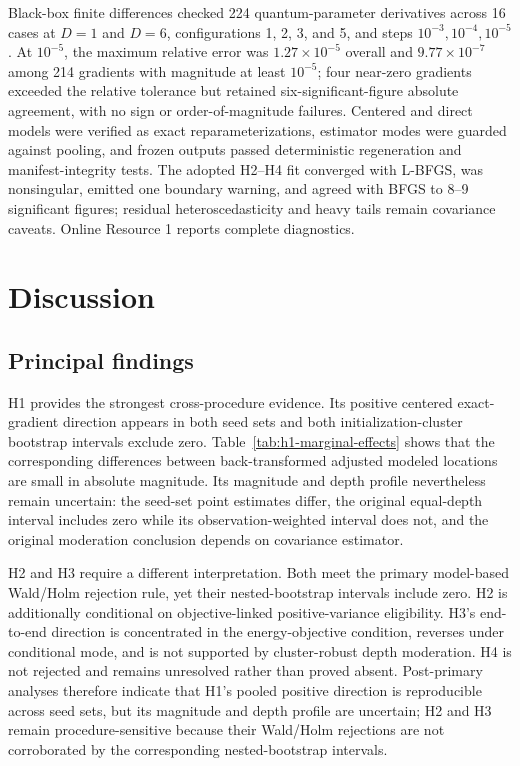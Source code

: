 \documentclass[pdflatex,sn-basic,Numbered]{sn-jnl}
\begin{document}
Black-box finite differences checked 224 quantum-parameter derivatives across 16 cases at $D=1$ and $D=6$, configurations 1, 2, 3, and 5, and steps $10^{-3},10^{-4},10^{-5}$. At $10^{-5}$, the maximum relative error was $1.27\times10^{-5}$ overall and $9.77\times10^{-7}$ among 214 gradients with magnitude at least $10^{-5}$; four near-zero gradients exceeded the relative tolerance but retained six-significant-figure absolute agreement, with no sign or order-of-magnitude failures. Centered and direct models were verified as exact reparameterizations, estimator modes were guarded against pooling, and frozen outputs passed deterministic regeneration and manifest-integrity tests. The adopted H2--H4 fit converged with L-BFGS, was nonsingular, emitted one boundary warning, and agreed with BFGS to 8--9 significant figures; residual heteroscedasticity and heavy tails remain covariance caveats. Online Resource 1 reports complete diagnostics.

\section{Discussion}

\subsection{Principal findings}

H1 provides the strongest cross-procedure evidence. Its positive centered exact-gradient direction appears in both seed sets and both initialization-cluster bootstrap intervals exclude zero. Table~\ref{tab:h1-marginal-effects} shows that the corresponding differences between back-transformed adjusted modeled locations are small in absolute magnitude. Its magnitude and depth profile nevertheless remain uncertain: the seed-set point estimates differ, the original equal-depth interval includes zero while its observation-weighted interval does not, and the original moderation conclusion depends on covariance estimator.

H2 and H3 require a different interpretation. Both meet the primary model-based Wald/Holm rejection rule, yet their nested-bootstrap intervals include zero. H2 is additionally conditional on objective-linked positive-variance eligibility. H3's end-to-end direction is concentrated in the energy-objective condition, reverses under conditional mode, and is not supported by cluster-robust depth moderation. H4 is not rejected and remains unresolved rather than proved absent. Post-primary analyses therefore indicate that H1's pooled positive direction is reproducible across seed sets, but its magnitude and depth profile are uncertain; H2 and H3 remain procedure-sensitive because their Wald/Holm rejections are not corroborated by the corresponding nested-bootstrap intervals.
\end{document}
